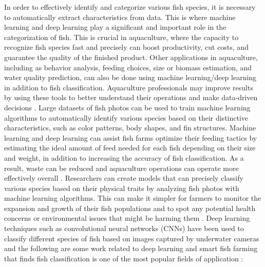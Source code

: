 In order to effectively identify and categorize various fish species, it is necessary to automatically extract characteristics from data. This is where machine learning and deep learning play a significant and important role in the categorization of fish. This is crucial in aquaculture, where the capacity to recognize fish species fast and precisely can boost productivity, cut costs, and guarantee the quality of the finished product. Other applications in aquaculture, including as behavior analysis, feeding choices, size or biomass estimation, and water quality prediction, can also be done using machine learning/deep learning in addition to fish classification. Aquaculture professionals may improve results by using these tools to better understand their operations and make data-driven decisions \cite{DLfishfarming}. Large datasets of fish photos can be used to train machine learning algorithms to automatically identify various species based on their distinctive characteristics, such as color patterns, body shapes, and fin structures. Machine learning and deep learning can assist fish farms optimize their feeding tactics by estimating the ideal amount of feed needed for each fish depending on their size and weight, in addition to increasing the accuracy of fish classification. As a result, waste can be reduced and aquaculture operations can operate more effectively overall \cite{knausgard2021temperate}. Researchers can create models that can precisely classify various species based on their physical traits by analyzing fish photos with machine learning algorithms. This can make it simpler for farmers to monitor the expansion and growth of their fish populations and to spot any potential health concerns or environmental issues that might be harming them \cite{zhao2021application}. Deep learning techniques such as convolutional neural networks (CNNs) have been used to classify different species of fish based on images captured by underwater cameras and the following are some work related to deep learning and smart fish farming that finds fish classification is one of the most popular fields of application \cite{DLfishfarming}:
